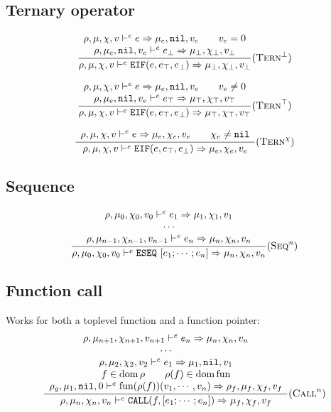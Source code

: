 \subsection{Ternary operator}
\[\dfrac{\begin{array}{c}
    \rho,\mu,\chi,v \vdash^e e\Rightarrow \mu_e,\texttt{nil},v_e \qquad v_e = 0\\
    \rho,\mu_e,\texttt{nil},v_e \vdash^e e_\bot \Rightarrow \mu_\bot,\chi_\bot,v_\bot
\end{array}}{\rho,\mu,\chi,v \vdash^e \texttt{EIF}(e, e_\top, e_\bot) \Rightarrow \mu_\bot,\chi_\bot,v_\bot}(\textsc{Tern}^\bot)\]

\[\dfrac{\begin{array}{c}
    \rho,\mu,\chi,v \vdash^e e\Rightarrow \mu_e,\texttt{nil},v_e \qquad v_e \ne 0\\
    \rho,\mu_e,\texttt{nil},v_e \vdash^e e_\top \Rightarrow \mu_\top,\chi_\top,v_\top \\
\end{array}}{\rho,\mu,\chi,v \vdash^e \texttt{EIF}(e, e_\top, e_\bot) \Rightarrow \mu_\top,\chi_\top,v_\top}(\textsc{Tern}^\top)\]

\[\dfrac{\begin{array}{c}
    \rho,\mu,\chi,v \vdash^e e\Rightarrow \mu_e,\chi_e,v_e \qquad \chi_e\ne\texttt{nil}
\end{array}}{\rho,\mu,\chi,v \vdash^e \texttt{EIF}(e, e_\top, e_\bot) \Rightarrow \mu_e,\chi_e,v_e}(\textsc{Tern}^\chi)\]


\subsection{Sequence}
\[\dfrac{\begin{array}{c}
    \rho,\mu_0,\chi_0,v_0 \vdash^e e_1 \Rightarrow \mu_1,\chi_1,v_1 \\
    \cdots \\
    \rho,\mu_{n-1},\chi_{n-1},v_{n-1} \vdash^e e_n \Rightarrow \mu_n,\chi_n,v_n \\
\end{array}}{\rho,\mu_0,\chi_0,v_0 \vdash^e \texttt{ESEQ}\ [e_1;\cdots;e_n] \Rightarrow \mu_n,\chi_n,v_n} (\textsc{Seq}^n)\]

\subsection{Function call}
Works for both a toplevel function and a function pointer:
\[\dfrac{\begin{array}{c}
    \rho,\mu_{n+1},\chi_{n+1},v_{n+1} \vdash^e e_n \Rightarrow \mu_n,\chi_n,v_n \\
    \cdots \\
    \rho,\mu_2,\chi_2,v_2 \vdash^e e_1 \Rightarrow \mu_1,\texttt{nil},v_1 \\
    f\in\operatorname{dom}\rho \qquad \rho(f)\in\operatorname{dom}\text{fun} \\
    \rho_g,\mu_1,\texttt{nil},0 \vdash^e \text{fun}(\rho(f))(v_1, \cdots, v_n) \Rightarrow \rho_f,\mu_f,\chi_f,v_f
\end{array}}{\rho,\mu_n,\chi_n,v_n \vdash^e \texttt{CALL}(f, [e_1; \cdots; e_n]) \Rightarrow \mu_f,\chi_f,v_f} (\textsc{Call}^n)\]

